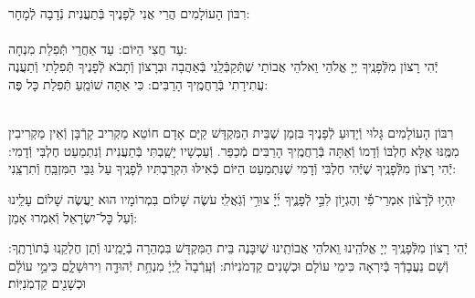 \documentclass[twoside, openany, parskip=half, 11pt]{book}
\begin{document}
\begin{sometimes}

\\
רִבּוֹן הָעוֹלָמִים הֲרֵי אֲנִי לְֿפָנֶיךָ בְּֿתַעֲנִית נְֿדָבָה לְֿמָחָר:\\
\\
עַד חֲצִי הַיּוֹם:  עַד אַחֲרֵי תְּֿפִלַת מִנְחָה:\\
יְֿהִי רָצוֹן מִלְּֿפָנֶֽיךָ יְיָ אֱלֹהַי וֵאלֹהֵי אֲבוֹתַי שֶׁתְּֿקַבְּֿלֵֽנִי בְּֿאַהֲבָה וּבְרָצוֹן וְֿתָבֹא לְֿפָנֶיךָ תְּֿפִלָתִי
וְֿתַעֲנֶה עֲתִירָתִי בְּֿרַחֲמֶֽיךָ הָרַבִּים: כִּי אַתָּה שׁוֹמֵֽעַ תְּֿפִלַת כָּל פֶּה: 

\sepline

\nextpage
{}\\
רִבּוֹן הָעוֹלָמִים גָּלוּי וְֿיָדֽוּעַ לְֿפָנֶיךָ בִּזְמַן שֶׁבֵּית הַמִּקְדָּשׁ קַיָּם אָדָם חוֹטֵא מַקְרִיב קָרְֿבָּן וְֿאֵין מַקְרִיבִין מִמֶּֽנּוּ אֶלָּא חֶלְבּוֹ וְֿדָמוֹ וְֿאַתָּה בְּֿרַחֲמֶֽיךָ הָרַבִּים מְֿכַפֵּר. וְֿעַכְשָׁיו יָשַֽׁבְתִּי בְּֿתַעֲנִית וְֿנִתְמַעֵט חֶלְבִּי וְֿדָמִי: יְֿהִי רָצוֹן מִלְּֿפָנֶֽיךָ שֶׁיְּֿהִי חֶלְבִּי וְֿדָמִי שֶׁנִּתְמַעַט הַיּוֹם כְּֿאִילּוּ הִקְרַבְתִּיו לְֿפָנֶֽיךָ עַל גַּבֵּי הַמִּזְבֵּֽחַ וְֿתִרְצֵֽנִי:


\end{sometimes}

יִֽהְי֥וּ לְֿרָצ֨וֹן אִמְרֵי־פִ֡י וְהֶגְי֣וֹן לִבִּ֣י לְֿפָנֶ֑יךָ יְ֜יָ֗ צוּרִ֥י וְֿגֹֽאֲלִֽי׃ עֹשֶׂה שָׁלוֹם בִּמְרוֹמָיו הוּא יַעֲשֶׂה שָׁלוֹם עָלֵֽינוּ וְֿעַל כׇּל־יִשְׂרָאֵל וְֿאִמְרוּ אָמֵן:


\begin{small}

יְֿהִי רָצוֹן מִלְּֿפָנֶֽיךָ יְיָ אֱלֹהֵֽינוּ וִֵאלֹהֵי אֲבוֹתֵֽינוּ שֶׁיִבָּנֶה בֵּית הַמִּקְדָּשׁ בִּמְהֵרָה בְֿיָמֵֽינוּ וְֿתֵן חֶלְקֵֽנוּ בְּֿתוֹרָתֶֽךָ: וְֿשָׁם נַעֲבָדְֿךָ בְּֿיִרְאָה כִּימֵי עוֹלָם וּכְשָׁנִים קַדְמֹנִיּוֹת:
וְֿעָֽרְֿבָה֙ לַֽיְיָ֔ מִנְחַ֥ת יְֿהוּדָ֖ה וִירוּשָׁלָ֑םִ כִּימֵ֣י עוֹלָ֔ם וּכְשָׁנִ֖ים קַדְמֹֽנִיּֽוֹת׃


\end{small}



\\
\end{document}
